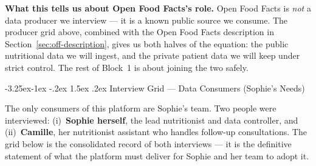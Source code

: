 \documentclass[a4paper,11pt,oneside,openany]{report}
\makeatletter
\renewcommand\subsection{\@startsection{subsection}{2}{\z@}%
  {-3.25ex\@plus -1ex \@minus -.2ex}%
  {1.5ex \@plus .2ex}%
  {\normalfont\large\bfseries\color{ntdarkgreen}}}
\newcommand{\off}{Open Food Facts}
\makeatother
\begin{document}
\noindent\textbf{What this tells us about \off{}'s role.} \off{} is
\emph{not} a data producer we interview --- it is a known public
source we consume. The producer grid above, combined with the
\off{} description in Section~\ref{sec:off-description}, gives us
both halves of the equation: the public nutritional data we will
ingest, and the private patient data we will keep under strict
control. The rest of Block~1 is about joining the two safely.

\subsection{Interview Grid --- Data Consumers (Sophie's Needs)}

The only consumers of this platform are Sophie's team. Two people
were interviewed: (i)~\textbf{Sophie herself}, the lead
nutritionist and data controller, and (ii)~\textbf{Camille}, her
nutritionist assistant who handles follow-up consultations. The
grid below is the consolidated record of both interviews --- it is
the definitive statement of what the platform must deliver for
Sophie and her team to adopt it.
\end{document}
